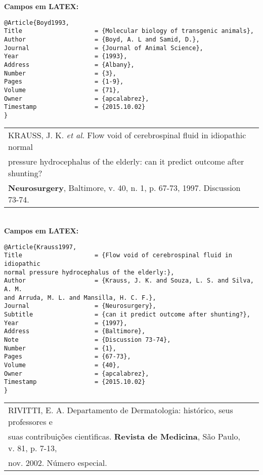 \textbf{Campos em LATEX:} 

\begin{verbatim}
@Article{Boyd1993,
Title                    = {Molecular biology of transgenic animals},
Author                   = {Boyd, A. L and Samid, D.},
Journal                  = {Journal of Animal Science},
Year                     = {1993},
Address                  = {Albany},
Number                   = {3},
Pages                    = {1-9},
Volume                   = {71},
Owner                    = {apcalabrez},
Timestamp                = {2015.10.02}
}
\end{verbatim}

\begin{tabular}{|l|c|} \hline
	KRAUSS, J. K. \textit{et al.} Flow void of cerebrospinal fluid in idiopathic normal\\
	pressure hydrocephalus of the elderly: can it predict outcome after
	shunting? \\\textbf{Neurosurgery}, Baltimore, v. 40, n. 1, p. 67-73, 1997.
	Discussion 73-74. 
	\\\hline
\end{tabular} \\

\textbf{Campos em LATEX:} 

\begin{verbatim}
@Article{Krauss1997,
Title                    = {Flow void of cerebrospinal fluid in idiopathic 
normal pressure hydrocephalus of the elderly:},
Author                   = {Krauss, J. K. and Souza, L. S. and Silva, A. M. 
and Arruda, M. L. and Mansilla, H. C. F.},
Journal                  = {Neurosurgery},
Subtitle                 = {can it predict outcome after shunting?},
Year                     = {1997},
Address                  = {Baltimore},
Note                     = {Discussion 73-74},
Number                   = {1},
Pages                    = {67-73},
Volume                   = {40},
Owner                    = {apcalabrez},
Timestamp                = {2015.10.02}
}
\end{verbatim}

\begin{tabular}{|l|c|} \hline
	RIVITTI, E. A. Departamento de Dermatologia: hist\'orico, seus professores
	e \\ suas contribui\c{c}\~oes cient\'{\i}ficas. \textbf{Revista de Medicina}, S\~ao Paulo, v. 81, p. 7-13, \\ nov. 2002. N\'umero especial.
	\\\hline
\end{tabular} \\

